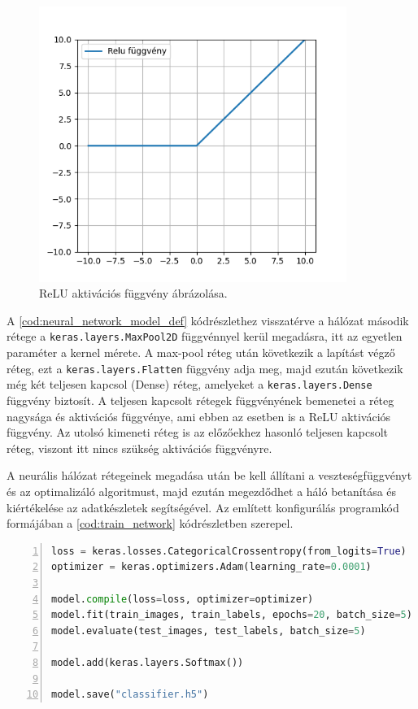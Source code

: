 \begin{figure}[!ht]
    \centering
    \includegraphics[width=100mm, keepaspectratio]{figures/relu_function.png}
    \caption{ReLU aktivációs függvény ábrázolása.}
    \label{fig:relu_function}
\end{figure}

\par A \ref{cod:neural_network_model_def} kódrészlethez visszatérve a hálózat második rétege a \lstinline{keras.layers.MaxPool2D} függvénnyel\cite{chollet2015keras,tensorflow_docs} kerül megadásra, itt az egyetlen paraméter a kernel mérete. A max-pool réteg után következik a lapítást végző réteg, ezt a \lstinline{keras.layers.Flatten} függvény\cite{chollet2015keras,tensorflow_docs} adja meg, majd ezután következik még két teljesen kapcsol (Dense) réteg, amelyeket a \lstinline{keras.layers.Dense} függvény\cite{chollet2015keras,tensorflow_docs} biztosít. A teljesen kapcsolt rétegek függvényének bemenetei a réteg nagysága és aktivációs függvénye, ami ebben az esetben is a ReLU aktivációs függvény. Az utolsó kimeneti réteg is az előzőekhez hasonló teljesen kapcsolt réteg, viszont itt nincs szükség aktivációs függvényre.
\par A neurális hálózat rétegeinek megadása után be kell állítani a veszteségfüggvényt és az optimalizáló algoritmust, majd ezután megezdődhet a háló betanítása és kiértékelése az adatkészletek segítségével. Az említett konfigurálás programkód formájában a \ref{cod:train_network} kódrészletben szerepel.

\begin{codewrapper}
\begin{lstlisting}[language=Python, numbers=left, caption={A neurális hálózat betanítása.}, label={cod:train_network}]
loss = keras.losses.CategoricalCrossentropy(from_logits=True)
optimizer = keras.optimizers.Adam(learning_rate=0.0001)

model.compile(loss=loss, optimizer=optimizer)
model.fit(train_images, train_labels, epochs=20, batch_size=5)
model.evaluate(test_images, test_labels, batch_size=5)

model.add(keras.layers.Softmax())

model.save("classifier.h5")
\end{lstlisting}
\end{codewrapper}


